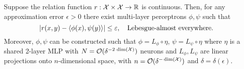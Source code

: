 \begin{theorem}\label{theorem:asymemtric_inner_prod_rel_func_class}
    Suppose the relation function $r: {\mathcal{X}} \times {\mathcal{X}} \to \mathbb{R}$ is continuous. 
    Then, for any approximation error $\epsilon > 0$ there exist multi-layer perceptrons $\phi, \psi$ such that
    \begin{equation*}
        \left\lvert r(x,y) - \left \langle \phi(x), \psi(y) \right\rangle\right\rvert \leq \varepsilon, \quad \text{Lebesgue-almost everywhere.}
    \end{equation*}
    Moreover, $\phi, \psi$ can be constructed such that $\phi = L_\phi \circ \eta$, $\psi = L_\psi \circ \eta$ where $\eta$ is a shared 2-layer MLP with $N = {\mathcal{O}}(\delta^{- 2 \,\dim({\mathcal{X}})})$ neurons and $L_\phi, L_\psi$ are linear projections onto $n$-dimensional space, with $n = {\mathcal{O}}(\delta^{- \dim({\mathcal{X}})})$ and $\delta = \delta(\epsilon)$.
\end{theorem}
